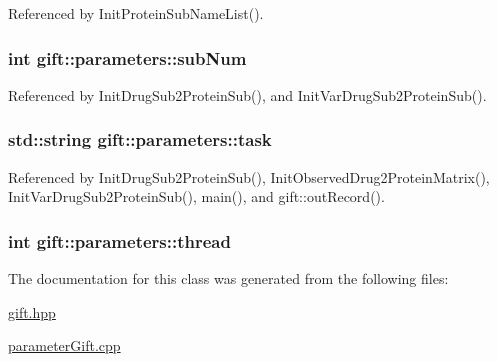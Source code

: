 Referenced by Init\+Protein\+Sub\+Name\+List().

\subsubsection[{\texorpdfstring{sub\+Num}{subNum}}]{\setlength{\rightskip}{0pt plus 5cm}int gift\+::parameters\+::sub\+Num}\hypertarget{classgift_1_1parameters_a3736b9054e162bc4bf63d018744ff0c3}{}\label{classgift_1_1parameters_a3736b9054e162bc4bf63d018744ff0c3}


Referenced by Init\+Drug\+Sub2\+Protein\+Sub(), and Init\+Var\+Drug\+Sub2\+Protein\+Sub().

\subsubsection[{\texorpdfstring{task}{task}}]{\setlength{\rightskip}{0pt plus 5cm}std\+::string gift\+::parameters\+::task}\hypertarget{classgift_1_1parameters_a59c1e1b83354be0dcc511743c4fe0cc1}{}\label{classgift_1_1parameters_a59c1e1b83354be0dcc511743c4fe0cc1}


Referenced by Init\+Drug\+Sub2\+Protein\+Sub(), Init\+Observed\+Drug2\+Protein\+Matrix(), Init\+Var\+Drug\+Sub2\+Protein\+Sub(), main(), and gift\+::out\+Record().

\subsubsection[{\texorpdfstring{thread}{thread}}]{\setlength{\rightskip}{0pt plus 5cm}int gift\+::parameters\+::thread}\hypertarget{classgift_1_1parameters_a0af23934a569abd605e9521df0a049ce}{}\label{classgift_1_1parameters_a0af23934a569abd605e9521df0a049ce}


The documentation for this class was generated from the following files\+:\begin{DoxyCompactItemize}
\item 
\hyperlink{gift_8hpp}{gift.\+hpp}\item 
\hyperlink{parameter_gift_8cpp}{parameter\+Gift.\+cpp}\end{DoxyCompactItemize}
